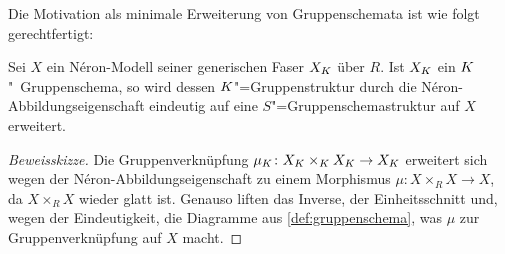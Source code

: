 Die Motivation als minimale Erweiterung von Gruppenschemata ist wie
folgt gerechtfertigt:
\begin{Lemma}\label{thm:gruppenschemaerweiterung}
  Sei $X$ ein Néron-Modell seiner generischen Faser $X_{K}$ über $R$. Ist
  $X_{K}$ ein $K$"~Grup\-pen\-sche\-ma, so wird dessen $K$"=Gruppenstruktur
  durch die Néron-Abbildungseigenschaft eindeutig auf eine $S$"=Gruppenschemastruktur auf
  $X$ erweitert.
  \begin{proof}[Beweisskizze]
    Die Gruppenverknüpfung $\mu_{K}\colon X_{K}\times_{K} X_{K}\to X_{K}$
    erweitert sich wegen der Néron-Abbildungseigenschaft zu einem Morphismus
    $\mu\colon X\times_R X\to X$, da $X\times_R X$ wieder glatt ist.
    Genauso liften das Inverse, der Einheitsschnitt und, wegen der
    Eindeutigkeit, die Diagramme aus \ref{def:gruppenschema}, was
    $\mu$ zur Gruppenverknüpfung auf $X$ macht.
  \end{proof}
\end{Lemma}

